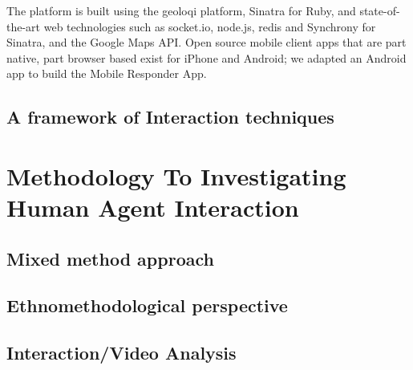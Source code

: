 The platform is built using the geoloqi platform, Sinatra for Ruby, and state-of- the-art web technologies such as socket.io, node.js, redis and Synchrony for Sinatra, and the Google Maps API. Open source mobile client apps that are part native, part browser based exist for iPhone and Android; we adapted an Android app to build the Mobile Responder App.\\

\section{A framework of Interaction techniques}

\chapter{Methodology To Investigating Human Agent Interaction}

\section{ Mixed method approach }

\section{ Ethnomethodological perspective }

\section{ Interaction/Video Analysis}



